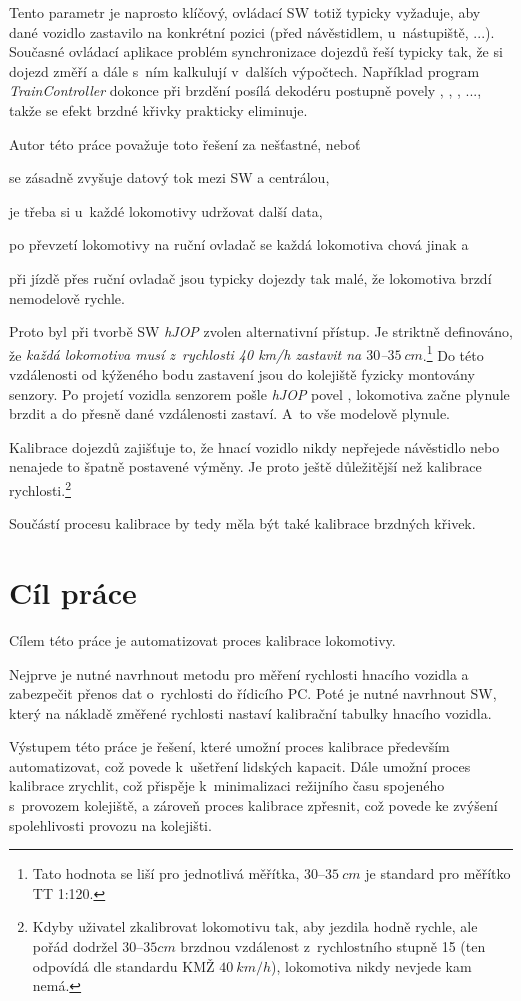 Tento parametr je naprosto klíčový, ovládací SW totiž typicky vyžaduje, aby dané
vozidlo zastavilo na konkrétní pozici (před návěstidlem, u~nástupiště, ...).
Současné ovládací aplikace problém synchronizace dojezdů řeší typicky tak, že si
dojezd změří a dále s~ním kalkulují v~dalších výpočtech. Například program
\textit{TrainController} \cite{traincontroller:web} dokonce při brzdění
posílá dekodéru postupně povely , ,
, ..., takže se efekt brzdné křivky prakticky eliminuje.

Autor této práce považuje toto řešení za nešťastné, neboť
\begin{compactenum}
\item se zásadně zvyšuje datový tok mezi SW a centrálou,
\item je třeba si u~každé lokomotivy udržovat další data,
\item po převzetí lokomotivy na ruční ovladač se každá lokomotiva chová jinak a
\item při jízdě přes ruční ovladač jsou typicky dojezdy tak malé, že lokomotiva
      brzdí nemodelově rychle.
\end{compactenum}

Proto byl při tvorbě SW \textit{hJOP} zvolen alternativní přístup. Je striktně
definováno, že \textit{každá lokomotiva musí z~rychlosti 40 km/h zastavit na
$30$--$35\ cm$}.\footnote{Tato hodnota se liší pro jednotlivá měřítka,
$30$--$35\ cm$ je standard pro měřítko TT 1:120.} Do této vzdálenosti od
kýženého bodu zastavení jsou do kolejiště fyzicky montovány senzory. Po
projetí vozidla senzorem pošle \textit{hJOP} povel ,
lokomotiva začne plynule brzdit a do přesně dané vzdálenosti zastaví. A~to vše
modelově plynule.

Kalibrace dojezdů zajišťuje to, že hnací vozidlo nikdy nepřejede návěstidlo nebo
nenajede to špatně postavené výměny. Je proto ještě důležitější než kalibrace
rychlosti.\footnote{Kdyby uživatel zkalibrovat lokomotivu tak, aby jezdila
hodně rychle, ale pořád dodržel $30$--$35cm$ brzdnou vzdálenost z~rychlostního
stupně 15 (ten odpovídá dle standardu KMŽ $40\ km/h$), lokomotiva nikdy nevjede
kam nemá.}

Součástí procesu kalibrace by tedy měla být také kalibrace brzdných křivek.

\section{Cíl práce}

Cílem této práce je automatizovat proces kalibrace lokomotivy.

Nejprve je nutné navrhnout metodu pro měření rychlosti hnacího vozidla a
zabezpečit přenos dat o~rychlosti do řídicího PC. Poté je nutné navrhnout SW,
který na nákladě změřené rychlosti nastaví kalibrační tabulky hnacího vozidla.

Výstupem této práce je řešení, které umožní proces kalibrace především
automatizovat, což povede k~ušetření lidských kapacit. Dále umožní proces
kalibrace zrychlit, což přispěje k~minimalizaci režijního času spojeného
s~provozem kolejiště, a zároveň proces kalibrace zpřesnit, což povede ke
zvýšení spolehlivosti provozu na kolejišti.

